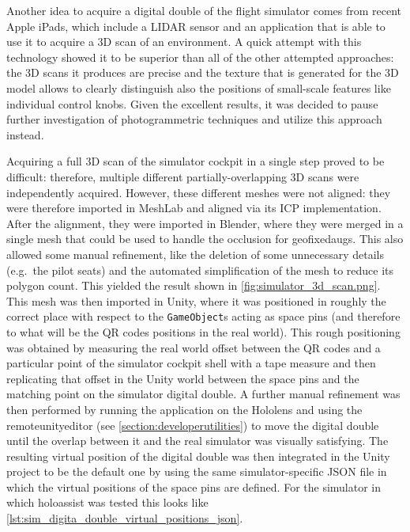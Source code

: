 Another idea to acquire a digital double of the flight simulator comes from recent Apple iPads\cite{apple_inc_ipad_nodate}, which include a LIDAR sensor and an application that is able to use it to acquire a 3D scan of an environment. A quick attempt with this technology showed it to be superior than all of the other attempted approaches: the 3D scans it produces are precise and the texture that is generated for the 3D model allows to clearly distinguish also the positions of small-scale features like individual control knobs. Given the excellent results, it was decided to pause further investigation of photogrammetric techniques and utilize this approach instead.

Acquiring a full 3D scan of the simulator cockpit in a single step proved to be difficult: therefore, multiple different partially-overlapping 3D scans were independently acquired. However, these different meshes were not aligned: they were therefore imported in MeshLab\cite{cignoni_meshlab_2008} and aligned via its \gls{ICP} implementation\cite{zhang_fast_2021}. After the alignment, they were imported in Blender\cite{blender_foundation_blender_nodate}, where they were merged in a single mesh that could be used to handle the occlusion for \glspl{geofixedaug}. This also allowed some manual refinement, like the deletion of some unnecessary details (e.g.\ the pilot seats) and the automated simplification of the mesh to reduce its polygon count. This yielded the result shown in \autoref{fig:simulator_3d_scan.png}. This mesh was then imported in Unity, where it was positioned in roughly the correct place with respect to the \texttt{GameObject}s acting as space pins (and therefore to what will be the QR codes positions in the real world). This rough positioning was obtained by measuring the real world offset between the QR codes and a particular point of the simulator cockpit shell with a tape measure and then replicating that offset in the Unity world between the space pins and the matching point on the simulator digital double. A further manual refinement was then performed by running the application on the Hololens and using the \gls{remoteunityeditor} (see \autoref{section:developerutilities}) to move the digital double until the overlap between it and the real simulator was visually satisfying. The resulting virtual position of the digital double was then integrated in the Unity project to be the default one by using the same simulator-specific JSON file in which the virtual positions of the space pins are defined. For the simulator in which \gls{holoassist} was tested this looks like \autoref{lst:sim_digita_double_virtual_positions_json}.

